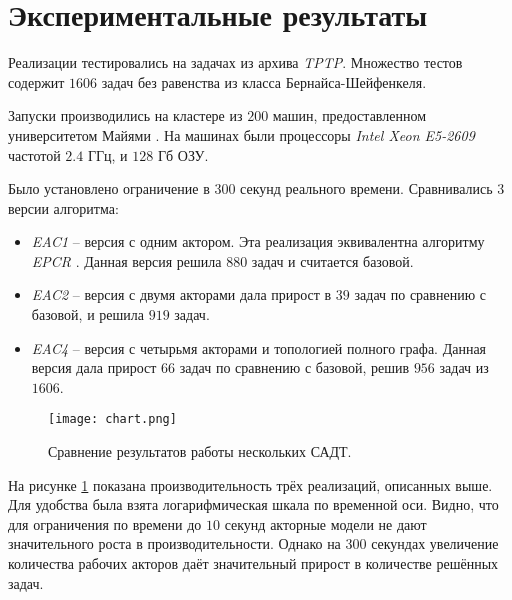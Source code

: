 \section{Экспериментальные результаты}

Реализации тестировались на задачах из архива \emph{TPTP}. Множество тестов содержит $1606$ задач без равенства из класса Бернайса-Шейфенкеля. 

Запуски производились на кластере из $200$ машин, предоставленном университетом Майями \cite{StarExec}. На машинах были процессоры \emph{Intel Xeon E5-2609} частотой $2.4$ ГГц, и $128$ Гб ОЗУ.

Было установлено ограничение в $300$ секунд реального времени. Сравнивались $3$ версии алгоритма:
\begin{itemize}[label=*]
	\item \emph{EAC1} -- версия с одним актором. Эта реализация эквивалентна алгоритму \emph{EPCR} \cite{DBLP:journals/corr/ItegulovSP17}. Данная версия решила $880$ задач и считается базовой.
    \item \emph{EAC2} -- версия с двумя акторами дала прирост в $39$ задач по сравнению с базовой, и решила $919$ задач.
    \item \emph{EAC4} -- версия с четырьмя акторами и топологией полного графа. Данная версия дала прирост $66$ задач по сравнению с базовой, решив $956$ задач из $1606$.
\end{itemize}


\begin{figure}[!h]
\centering
\texttt{[image: chart.png]}
\caption{Сравнение результатов работы нескольких САДТ.}\label{fig:chart}
\end{figure}

На рисунке \ref{fig:chart} показана производительность трёх реализаций, описанных выше. Для удобства была взята логарифмическая шкала по временной оси. Видно, что для ограничения по времени до $10$ секунд акторные модели не дают значительного роста в производительности. Однако на $300$ секундах увеличение количества рабочих акторов даёт значительный прирост в количестве решённых задач.

